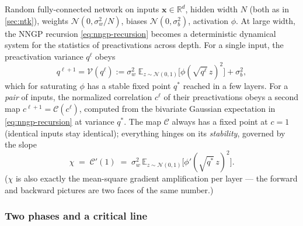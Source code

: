 \documentclass[11pt]{article}
\newcommand{\R}{\mathbb{R}}
\newcommand{\E}{\mathbb{E}}
\newcommand{\bv}[1]{\boldsymbol{#1}}
\begin{document}
Random fully-connected network on inputs $\bv{x} \in \R^d$, hidden width
$N$ (both as in \cref{sec:ntk}), weights
$\mathcal{N}(0, \sigma_w^2/N)$, biases $\mathcal{N}(0, \sigma_b^2)$,
activation $\phi$. At large width, the NNGP recursion
\cref{eq:nngp-recursion} becomes a deterministic dynamical system for the
statistics of preactivations across depth. For a single input, the
preactivation variance $q^\ell$ obeys
\begin{equation}
  \label{eq:variance-map}
  q^{\ell+1} = \mathcal{V}(q^{\ell})
  := \sigma_w^2\; \E_{z\sim\mathcal{N}(0,1)}
  \bigl[\phi(\sqrt{q^{\ell}}\,z)^2\bigr] + \sigma_b^2 ,
\end{equation}
which for saturating $\phi$ has a stable fixed point $q^{*}$ reached in a
few layers. For a \emph{pair} of inputs, the normalized correlation
$c^\ell$ of their preactivations obeys a second map
$c^{\ell+1} = \mathcal{C}(c^{\ell})$, computed from the bivariate Gaussian
expectation in \cref{eq:nngp-recursion} at variance $q^*$. The map
$\mathcal{C}$ always has a fixed point at $c = 1$ (identical inputs stay
identical); everything hinges on its \emph{stability}, governed by the slope
\begin{equation}
  \label{eq:chi}
  \chi \;=\; \mathcal{C}'(1)
  \;=\; \sigma_w^{2}\, \E_{z\sim\mathcal{N}(0,1)}
  \bigl[\phi'(\sqrt{q^{*}}\,z)^{2}\bigr].
\end{equation}
($\chi$ is also exactly the mean-square gradient amplification per layer ---
the forward and backward pictures are two faces of the same number.)

\subsubsection{Two phases and a critical line}
\end{document}
